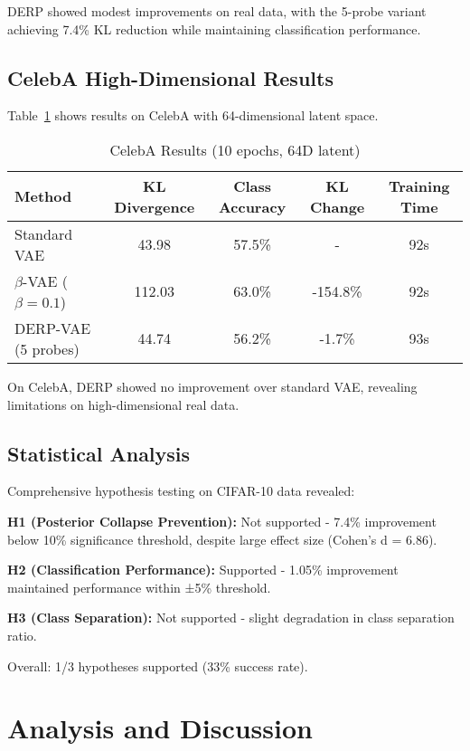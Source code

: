 \documentclass{article}
\begin{document}
DERP showed modest improvements on real data, with the 5-probe variant achieving 7.4\% KL reduction while maintaining classification performance.

\subsection{CelebA High-Dimensional Results}

Table~\ref{tab:celeba_results} shows results on CelebA with 64-dimensional latent space.

\begin{table}[t]
\caption{CelebA Results (10 epochs, 64D latent)}
\label{tab:celeba_results}
\centering
\begin{tabular}{lcccc}
\toprule
Method & KL Divergence & Class Accuracy & KL Change & Training Time \\
\midrule
Standard VAE & 43.98 & 57.5\% & - & 92s \\
$\beta$-VAE ($\beta=0.1$) & 112.03 & 63.0\% & -154.8\% & 92s \\
DERP-VAE (5 probes) & 44.74 & 56.2\% & -1.7\% & 93s \\
\bottomrule
\end{tabular}
\end{table}

On CelebA, DERP showed no improvement over standard VAE, revealing limitations on high-dimensional real data.

\subsection{Statistical Analysis}

Comprehensive hypothesis testing on CIFAR-10 data revealed:

\textbf{H1 (Posterior Collapse Prevention):} Not supported - 7.4\% improvement below 10\% significance threshold, despite large effect size (Cohen's d = 6.86).

\textbf{H2 (Classification Performance):} Supported - 1.05\% improvement maintained performance within ±5\% threshold.

\textbf{H3 (Class Separation):} Not supported - slight degradation in class separation ratio.

Overall: 1/3 hypotheses supported (33\% success rate).

\section{Analysis and Discussion}
\end{document}
